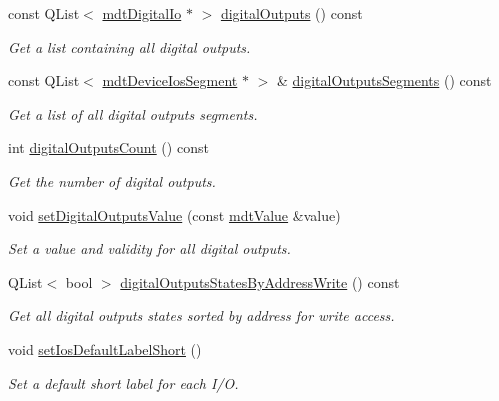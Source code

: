 \begin{DoxyCompactItemize}
const QList$<$ \hyperlink{classmdt_digital_io}{mdtDigitalIo} $\ast$ $>$ \hyperlink{classmdt_device_ios_a74418e6be28a2017140f102484f0df31}{digitalOutputs} () const 
\begin{DoxyCompactList}\small\item\em Get a list containing all digital outputs. \end{DoxyCompactList}\item 
\hypertarget{classmdt_device_ios_ad2b06fe61d71150ac57d77e9bfc7894b}{
const QList$<$ \hyperlink{classmdt_device_ios_segment}{mdtDeviceIosSegment} $\ast$ $>$ \& \hyperlink{classmdt_device_ios_ad2b06fe61d71150ac57d77e9bfc7894b}{digitalOutputsSegments} () const }
\label{classmdt_device_ios_ad2b06fe61d71150ac57d77e9bfc7894b}

\begin{DoxyCompactList}\small\item\em Get a list of all digital outputs segments. \end{DoxyCompactList}\item 
\hypertarget{classmdt_device_ios_a81041e03a387fdcdc2638527b27a0ff6}{
int \hyperlink{classmdt_device_ios_a81041e03a387fdcdc2638527b27a0ff6}{digitalOutputsCount} () const }
\label{classmdt_device_ios_a81041e03a387fdcdc2638527b27a0ff6}

\begin{DoxyCompactList}\small\item\em Get the number of digital outputs. \end{DoxyCompactList}\item 
\hypertarget{classmdt_device_ios_a5685ba4a6cee6fad1555dc9b51d1d932}{
void \hyperlink{classmdt_device_ios_a5685ba4a6cee6fad1555dc9b51d1d932}{setDigitalOutputsValue} (const \hyperlink{classmdt_value}{mdtValue} \&value)}
\label{classmdt_device_ios_a5685ba4a6cee6fad1555dc9b51d1d932}

\begin{DoxyCompactList}\small\item\em Set a value and validity for all digital outputs. \end{DoxyCompactList}\item 
\hypertarget{classmdt_device_ios_a67388ae8181a19da07f7b74320a516e3}{
QList$<$ bool $>$ \hyperlink{classmdt_device_ios_a67388ae8181a19da07f7b74320a516e3}{digitalOutputsStatesByAddressWrite} () const }
\label{classmdt_device_ios_a67388ae8181a19da07f7b74320a516e3}

\begin{DoxyCompactList}\small\item\em Get all digital outputs states sorted by address for write access. \end{DoxyCompactList}\item 
void \hyperlink{classmdt_device_ios_a100ce7dcaecb7ee9a1a3e68f75cdac73}{setIosDefaultLabelShort} ()
\begin{DoxyCompactList}\small\item\em Set a default short label for each I/O. \end{DoxyCompactList}\end{DoxyCompactItemize}


